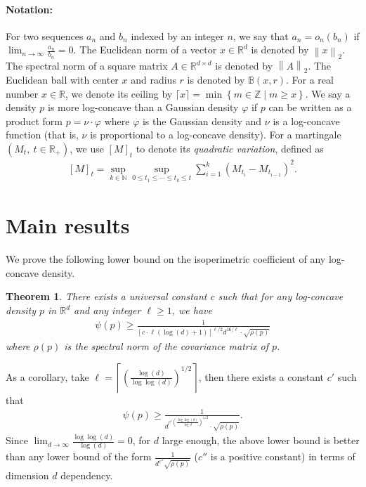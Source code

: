 \documentclass[11pt,twoside]{article}
\newcommand{\spec}[1]{\rho\parenth{#1}}
\newcommand{\isoperi}{\psi}
\theoremstyle{named}
\theoremstyle{plain}
\newtheorem{theorem}{Theorem}
\newcommand{\vecnorm}[2]{\left\| #1\right\|_{#2}}
\newcommand{\usedim}{\ensuremath{d}}
\newcommand{\dims}{\usedim}
\newcommand{\real}{\ensuremath{\mathbb{R}}}
\newcommand{\brackets}[1]{\left[ #1 \right]}
\newcommand{\parenth}[1]{\left( #1 \right)}
\newcommand{\braces}[1]{\left\{ #1 \right \}}
\begin{document}
\paragraph{Notation:} For two sequences $a_n$ and $b_n$ indexed by an integer $n$, we say that $a_n = o_n(b_n)$ if $\lim_{n \to \infty} \frac{a_n}{b_n} = 0$. The Euclidean norm of a vector $x \in \real^\dims$ is denoted by $\vecnorm{x}{2}$. The spectral norm of a square matrix $A \in \real^{\dims \times \dims}$ is denoted by $\vecnorm{A}{2}$. The Euclidean ball with center $x$ and radius $r$ is denoted by $\mathbb{B}(x, r)$. For a real number $x \in \real$, we denote its ceiling by $\lceil x \rceil = \min\braces{m \in \mathbb{Z} \mid m \geq x}$. We say a density $p$ is more log-concave than a Gaussian density $\varphi$ if $p$ can be written as a product form $p = \nu \cdot \varphi$ where $\varphi$ is the Gaussian density and $\nu$ is a log-concave function (that is, $\nu$ is proportional to a log-concave density). For a martingale $(M_t,\ t \in \real_+)$, we use $\brackets{M}_t$ to denote its \textit{quadratic variation}, defined as
\begin{align*}
  \brackets{M}_t = \sup_{k \in \mathbb{N}} \sup_{0 \leq t_1 \leq \cdots \leq t_k \leq t} \sum_{i=1}^k \parenth{M_{t_i} - M_{t_{i-1}}}^2.
\end{align*}



\section{Main results} %
\label{sec:main_results}
We prove the following lower bound on the isoperimetric coefficient of any log-concave density.
\begin{theorem}
  \label{thm:main_KLS}
  There exists a universal constant $c$ such that for any log-concave density $p$ in $\real^\dims$ and any integer $\ell \geq 1$, we have
  \begin{align}
    \label{eq:main_KLS}
    \isoperi(p) \geq \frac{1}{\brackets{c \cdot \ell \parenth{\log(\dims)+1}}^{\ell/2} \dims^{16/\ell} \cdot \sqrt{\spec{p}}}
  \end{align}
  where $\spec{p}$ is the spectral norm of the covariance matrix of $p$.
\end{theorem}
As a corollary, take $\ell = \left\lceil \parenth{\frac{\log(\dims)}{\log\log(\dims)}}^{1/2} \right\rceil$, then there exists a constant $c'$ such that
\begin{align*}
  \isoperi(p) \geq \frac{1}{\dims^{c' \parenth{\frac{\log\log(\dims)}{\log{\dims}}}^{1/2}}  \cdot \sqrt{\spec{p}}}.
\end{align*}
Since $\lim_{\dims \to \infty} \frac{\log\log(\dims)}{\log(\dims)} = 0$, for $\dims$ large enough, the above lower bound is better than any lower bound of the form $\frac{1}{\dims^{c''} \sqrt{\spec{p}}} $ ($c''$ is a positive constant) in terms of dimension $\dims$ dependency.
\end{document}
